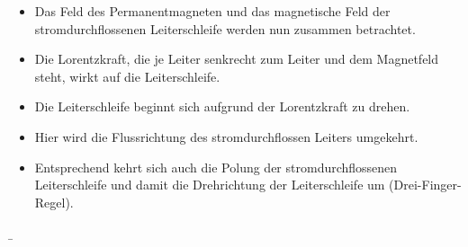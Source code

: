 \begin{frame}
{\begin{minipage}{0.25\textwidth}
		\end{minipage}
		\begin{minipage}{0.74\textwidth}
			\begin{itemize}
				\item Das Feld des Permanentmagneten und das magnetische Feld der stromdurchflossenen Leiterschleife werden nun zusammen betrachtet.
				\item Die Lorentzkraft, die je Leiter senkrecht zum Leiter und dem Magnetfeld steht, wirkt auf die Leiterschleife. 
				\item Die Leiterschleife beginnt sich aufgrund der Lorentzkraft zu drehen.%
			\end{itemize}%
		\end{minipage}
		\begin{minipage}{0.25\textwidth}
		\end{minipage}
		\begin{minipage}{0.74\textwidth}
			\begin{itemize}
				\item Hier wird die Flussrichtung des stromdurchflossen Leiters umgekehrt.
				\item Entsprechend kehrt sich auch die Polung der stromdurchflossenen Leiterschleife und damit die Drehrichtung der Leiterschleife um (Drei-Finger-Regel).
			\end{itemize}
		\end{minipage}
	}
	\b{ %
		\begin{columns}
			\pause
			\pause
			\pause
		\end{columns}
	}
\end{frame}


